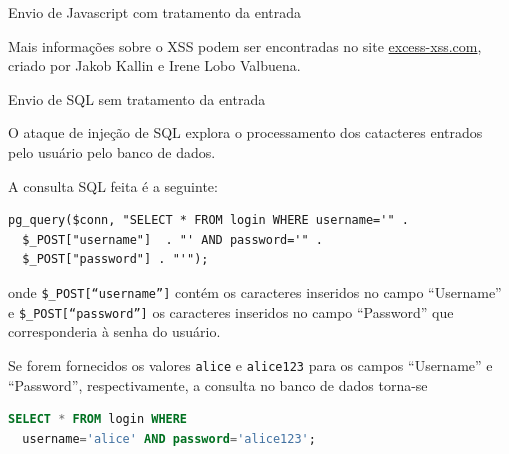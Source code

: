 \begin{frame}{}{Envio de Javascript com tratamento da entrada}

Mais informações sobre o XSS podem ser encontradas no site
\href{http://excess-xss.com}{excess-xss.com}, criado por Jakob Kallin e Irene
Lobo Valbuena.

\end{frame}


\begin{frame}[fragile]{}{Envio de SQL sem tratamento da entrada}

O ataque de injeção de SQL explora o processamento dos catacteres entrados pelo usuário pelo 
 banco de dados.  

\pause
A consulta SQL feita é a seguinte:

{\small
\begin{verbatim}
pg_query($conn, "SELECT * FROM login WHERE username='" . 
  $_POST["username"]  . "' AND password='" . 
  $_POST["password"] . "'");
\end{verbatim}
}

onde {\tt \$\_POST[``username'']} contém os caracteres
inseridos no campo ``Username'' e {\tt \$\_POST[``password'']} os
caracteres inseridos no campo ``Password'' que corresponderia à senha
do usuário.

\end{frame}

\begin{frame}[fragile]{}

Se forem fornecidos os valores {\tt alice} e {\tt alice123} para os
campos ``Username'' e ``Password'', respectivamente, a consulta no
banco de dados torna-se

\begin{lstlisting}[language=SQL]
SELECT * FROM login WHERE 
  username='alice' AND password='alice123';
\end{lstlisting}

\end{frame}


